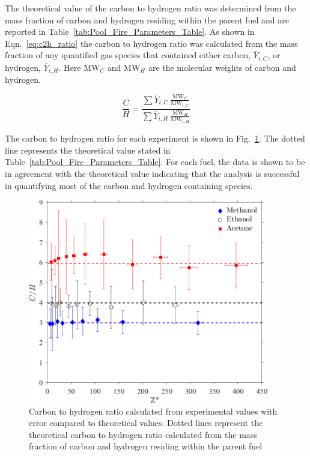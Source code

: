 \documentclass[12pt]{article}
\begin{document}
The theoretical value of the carbon to hydrogen ratio was determined from the mass fraction of carbon and hydrogen residing within the parent fuel and are reported in Table~\ref{tab:Pool_Fire_Parameters_Table}. As shown in Eqn.~\ref{eq:c2h_ratio} the carbon to hydrogen ratio was calculated from the mass fraction of any quantified gas species that contained either carbon, $\bar{Y}_{i,C}$, or hydrogen, $\bar{Y}_{i,H}$. Here $\textrm{MW}_{C}$ and $\textrm{MW}_{H}$ are the molecular weights of carbon and hydrogen.

\begin{equation}\label{eq:c2h_ratio}
 \frac{C}{H}=\frac{\sum{\bar{Y}_{i,C}~{\frac{\textrm{MW}_{C}}{\textrm{MW}_{i,C}}}}}{\sum{\bar{Y}_{i,H}~{\frac{\textrm{MW}_{H}}{\textrm{MW}_{i,H}}}}}
\end{equation}

The carbon to hydrogen ratio for each experiment is shown in Fig.~\ref{fig:C2H}. The dotted line represents the theoretical value stated in Table~\ref{tab:Pool_Fire_Parameters_Table}. For each fuel, the data is shown to be in agreement with the theoretical value indicating that the analysis is successful in quantifying most of the carbon and hydrogen containing species.

\begin{figure}[h!]
	\centering
\includegraphics[width=10.5cm, keepaspectratio]{C2H_ratio_Comparison.png}
	\caption[Carbon to hydrogen ratio calculated from experimental values compared to theoretical values]{Carbon to hydrogen ratio calculated from experimental values with error compared to theoretical values. Dotted lines represent the theoretical carbon to hydrogen ratio calculated from the mass fraction of carbon and hydrogen residing within the parent fuel}
	\label{fig:C2H}
\end{figure}
\end{document}
